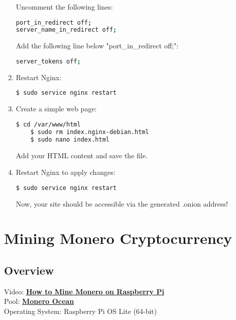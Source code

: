 \documentclass[a4paper,12pt]{article}
\begin{document}
\begin{enumerate}
Uncomment the following lines:
\begin{lstlisting}[language=bash, breaklines=true, breakatwhitespace=true, columns=fullflexible]
port_in_redirect off;
server_name_in_redirect off;
\end{lstlisting}

Add the following line below "port\_in\_redirect off;":
\begin{lstlisting}[language=bash, breaklines=true, breakatwhitespace=true, columns=fullflexible]
server_tokens off;
\end{lstlisting}

    \item Restart Nginx:
    \begin{lstlisting}[language=bash, breaklines=true, breakatwhitespace=true, columns=fullflexible]
    $ sudo service nginx restart
    \end{lstlisting}

    \item Create a simple web page:
    \begin{lstlisting}[language=bash, breaklines=true, breakatwhitespace=true, columns=fullflexible]
    $ cd /var/www/html
    $ sudo rm index.nginx-debian.html
    $ sudo nano index.html
    \end{lstlisting}
    Add your HTML content and save the file.

\item Restart Nginx to apply changes:
\begin{lstlisting}[language=bash, breaklines=true, breakatwhitespace=true, columns=fullflexible]
$ sudo service nginx restart
\end{lstlisting}
Now, your site should be accessible via the generated .onion address!
   
\end{enumerate}

\section{Mining Monero Cryptocurrency}

\subsection{Overview}
Video: \href{https://www.youtube.com/watch?v=hHtGN_JzoP8}{\textbf{\color{blue}How to Mine Monero on Raspberry Pi}} \\
Pool: \href{https://moneroocean.stream/}{\textbf{\color{blue}Monero Ocean}} \\
Operating System: Raspberry Pi OS Lite (64-bit)
\end{document}
